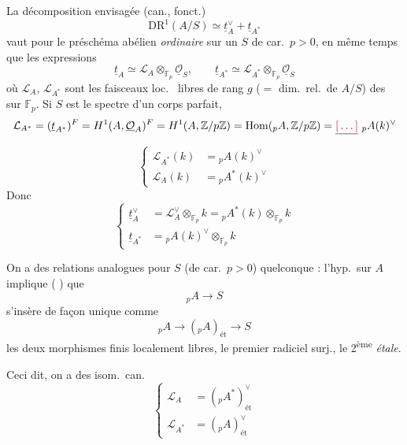 \documentclass[11pt,a4paper]{article}
\begin{document}
La décomposition envisagée (can., fonct.)
\[
\mathrm{DR}^1(A/S) \simeq \underline{t}_A^{\vee} + \underline{t}_{A^*}
\]
vaut pour le préschéma abélien \emph{ordinaire} sur un $S$ de car.\ $p >
0$, en même temps que les expressions
\[
\underline{t}_A \simeq \mathcal{L}_A \otimes_{\mathbb{F}_p} \underline{\mathcal{O}}_S ,
\qquad
\underline{t}_{A^*} \simeq \mathcal{L}_{A^*} \otimes_{\mathbb{F}_p} \underline{\mathcal{O}}_S
\]
où $\mathcal{L}_A$, $\mathcal{L}_{A^*}$ sont les faisceaux
 loc.\  libres de rang
$g$ ($=$ dim.\ rel.\ de $A/S$) des  sur
$\mathbb{F}_p$. Si $S$ est le spectre d'un
corps parfait,
\[
\mathcal{L}_{A^*} = (\underline{t}_{A^*})^{F} = H^1(A, \underline{\mathcal{O}}_A)^{F}
= H^1(A, \mathbb{Z}/p\mathbb{Z})
= \operatorname{Hom}({}_{p}A, \mathbb{Z}/p\mathbb{Z}) = \struck{\ill{}}\ {}_{p}A(k)^{\vee}
\]
\[
\left\{
\begin{aligned}
\mathcal{L}_{A^*}(k) &= {}_{p}A(k)^{\vee} \\
\mathcal{L}_{A}(k) &= {}_{p}A^*(k)^{\vee}
\end{aligned}
\right.
\]
Donc
\[
\left\{
\begin{aligned}
\underline{t}_A^{\vee} &= \mathcal{L}_A^{\vee} \otimes_{\mathbb{F}_p} k = {}_{p}A^*(k) \otimes_{\mathbb{F}_p} k \\
\underline{t}_{A^*} &= {}_{p}A(k)^{\vee} \otimes_{\mathbb{F}_p} k
\end{aligned}
\right.
\]

On a des relations analogues pour $S$ (de car.\ $p > 0$) quelconque :
l'hyp.\ sur $A$ implique ( \ill{}) que
\[
{}_{p}A \to S
\]
s'insère de façon unique comme 
\[
{}_{p}A \to ({}_{p}A)_{\text{ét}} \to S
\]
les deux morphismes finis localement libres, le premier radiciel surj., le
2\textsuperscript{ème} \emph{étale}.


Ceci dit, on a des isom.\ can.
\[
\left\{
\begin{aligned}
\mathcal{L}_A &= ({}_{p}A^*)_{\text{ét}}^{\vee} \\
\mathcal{L}_{A^*} &= ({}_{p}A)_{\text{ét}}^{\vee}
\end{aligned}
\right.
\]
\end{document}
